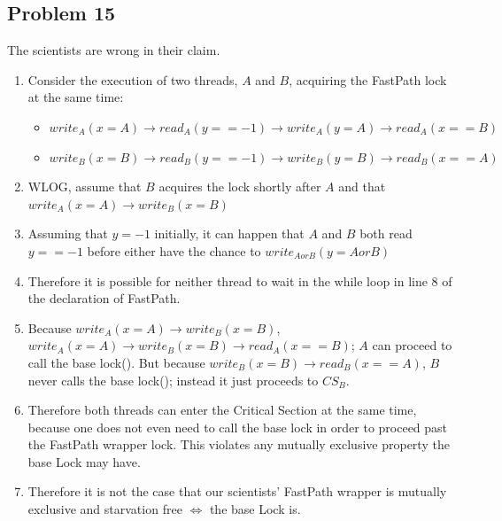 \documentclass[]{article}
\begin{document}
\subsection{Problem 15}
The scientists are wrong in their claim.
\begin{enumerate}
	\item Consider the execution of two threads, $A$ and $B$, acquiring the FastPath lock at the same time:
	\begin{itemize}
		\item $write_A(x = A) \rightarrow read_A(y == -1) \rightarrow write_A(y = A) \rightarrow read_A(x == B)$
		\item $write_B(x = B) \rightarrow read_B(y == -1) \rightarrow write_B(y = B) \rightarrow read_B(x == A)$
	\end{itemize}
	\item WLOG, assume that $B$ acquires the lock shortly after $A$ and that $write_A(x = A) \rightarrow write_B(x = B)$
	\item Assuming that $y = -1$ initially, it can happen that $A$ and $B$ both read $y == -1$ before either have the chance to $write_{A or B}(y = A or B)$
	\item Therefore it is possible for neither thread to wait in the while loop in line 8 of the declaration of FastPath.
	\item Because $write_A(x = A) \rightarrow write_B(x = B)$, $write_A(x = A) \rightarrow write_B(x = B) \rightarrow read_A(x == B)$; $A$ can proceed to call the base lock(). But because $write_B(x = B) \rightarrow read_B(x == A)$, $B$ never calls the base lock(); instead it just proceeds to $CS_B$.
	\item Therefore both threads can enter the Critical Section at the same time, because one does not even need to call the base lock in order to proceed past the FastPath wrapper lock. This violates any mutually exclusive property the base Lock may have.
	\item Therefore it is not the case that our scientists' FastPath wrapper is mutually exclusive and starvation free $\Leftrightarrow$ the base Lock is.
\end{enumerate}
\end{document}
